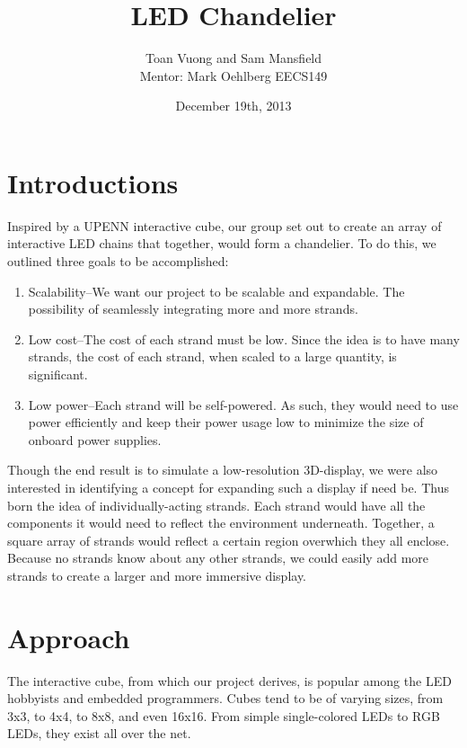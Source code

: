 \documentclass[10pt,titlepage]{article}
\begin{document}
  \title{LED Chandelier}
  \author{Toan Vuong and Sam Mansfield\\
          Mentor: Mark Oehlberg
          EECS149\\
         }
  \date{December 19th, 2013}
  \maketitle

  \section*{Introductions}
    Inspired by a UPENN interactive cube, our group set out to create an array of interactive LED chains that together, would form a chandelier. To do this, we outlined three goals to be accomplished:
    \begin{enumerate}
    \item Scalability--We want our project to be scalable and expandable. The possibility of seamlessly integrating more and more strands.
    \item Low cost--The cost of each strand must be low. Since the idea is to have many strands, the cost of each strand, when scaled to a large quantity, is significant.
    \item Low power--Each strand will be self-powered. As such, they would need to use power efficiently and keep their power usage low to minimize the size of onboard power supplies.
    \end{enumerate}

    Though the end result is to simulate a low-resolution 3D-display, we were also interested in identifying a concept for expanding such a display if need be. Thus born the idea of individually-acting strands. Each strand would have all the components it would need to reflect the environment underneath. Together, a square array of strands would reflect a certain region overwhich they all enclose. Because no strands know about any other strands, we could easily add more strands to create a larger and more immersive display.

  \section*{Approach}
  The interactive cube, from which our project derives, is popular among the LED hobbyists and embedded programmers. Cubes tend to be of varying sizes, from 3x3, to 4x4, to 8x8, and even 16x16. From simple single-colored LEDs to RGB LEDs, they exist all over the net.\\ 
\end{document}
